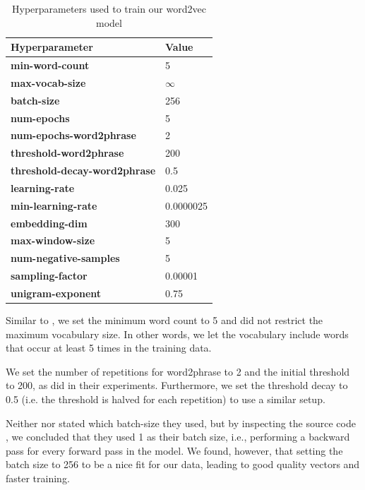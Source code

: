 \begin{table}[ht]
    \centering
    \begin{tabular}{@{}ll@{}}
    \toprule
    Hyperparameter & Value\\
    \midrule
    \trcolor \textbf{min-word-count} & 5\\
    \textbf{max-vocab-size} & $\infty$ \\
    \trcolor \textbf{batch-size} & 256\\
    \textbf{num-epochs} & 5\\
    \trcolor \textbf{num-epochs-word2phrase} & 2\\
    \textbf{threshold-word2phrase} & 200\\
    \trcolor \textbf{threshold-decay-word2phrase} & 0.5\\
    \textbf{learning-rate} & 0.025\\
    \trcolor \textbf{min-learning-rate} & 0.0000025\\
    \textbf{embedding-dim} & 300\\
    \trcolor \textbf{max-window-size} & 5\\
    \textbf{num-negative-samples} & 5\\
    \trcolor \textbf{sampling-factor} & 0.00001\\
    \textbf{unigram-exponent} & 0.75\\
    \bottomrule
    \end{tabular}
    \caption{Hyperparameters used to train our word2vec model}
    \label{table:word2vec-hyperparameter-choices}
\end{table}

Similar to \cite{mikolov2013b}, we set the minimum word count to 5 and did not restrict the maximum vocabulary size. In other words, we let the vocabulary include words that occur at least 5 times in the training data.

We set the number of repetitions for word2phrase to 2 and the initial threshold to 200, as \cite{mikolov2013b} did in their experiments. Furthermore, we set the threshold decay to 0.5 (i.e. the threshold is halved for each repetition) to use a similar setup.

Neither \cite{mikolov2013a} nor \cite{mikolov2013b} stated which batch-size they used, but by inspecting the source code \cite[line 542]{Word2vecCCode}, we concluded that they used 1 as their batch size, i.e., performing a backward pass for every forward pass in the model. We found, however, that setting the batch size to 256 to be a nice fit for our data, leading to good quality vectors and faster training.

